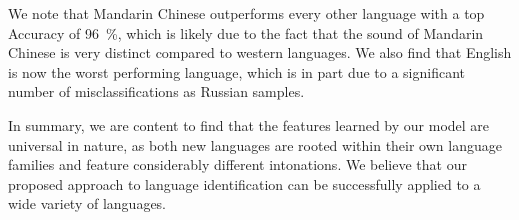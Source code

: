 \documentclass{llncs}
\begin{document}
We note that Mandarin Chinese outperforms every other language with a top Accuracy of \SI{96}{\percent}, which is likely due to the fact that the sound of Mandarin Chinese is very distinct compared to western languages.
We also find that English is now the worst performing language, which is in part due to a significant number of misclassifications as Russian samples.

In summary, we are content to find that the features learned by our model are universal in nature, as both new languages are rooted within their own language families and feature considerably different intonations.
We believe that our proposed approach to language identification can be successfully applied to a wide variety of languages.
 



\end{document}

